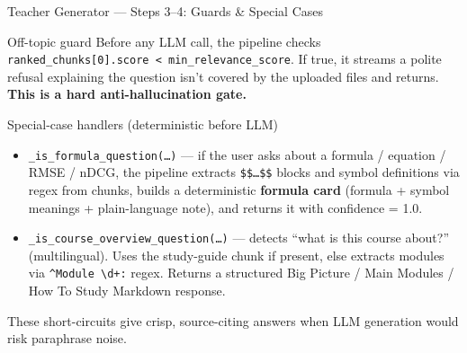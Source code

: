 \documentclass[aspectratio=169, 10pt]{beamer}
\begin{document}
\begin{frame}{Teacher Generator --- Steps 3--4: Guards \& Special Cases}
  \scriptsize
  \begin{block}{Off-topic guard}
    Before any LLM call, the pipeline checks
    \texttt{ranked\_chunks[0].score < min\_relevance\_score}. If true,
    it streams a polite refusal explaining the question isn't covered
    by the uploaded files and returns. \textbf{This is a hard
    anti-hallucination gate.}
  \end{block}

  \begin{block}{Special-case handlers (deterministic before LLM)}
    \begin{itemize}
      \setlength\itemsep{0pt}
      \item \texttt{\_is\_formula\_question(\dots)} --- if the user
            asks about a formula / equation / RMSE / nDCG, the pipeline
            extracts \texttt{\$\$\dots\$\$} blocks and symbol definitions
            via regex from chunks, builds a deterministic
            \textbf{formula card} (formula + symbol meanings + plain-language
            note), and returns it with confidence = 1.0.
      \item \texttt{\_is\_course\_overview\_question(\dots)} --- detects
            ``what is this course about?'' (multilingual). Uses the
            study-guide chunk if present, else extracts modules via
            \texttt{\textasciicircum Module \textbackslash d+:} regex.
            Returns a structured Big Picture / Main Modules / How To Study
            Markdown response.
    \end{itemize}
  \end{block}
  These short-circuits give crisp, source-citing answers when LLM
  generation would risk paraphrase noise.
\end{frame}
\end{document}
